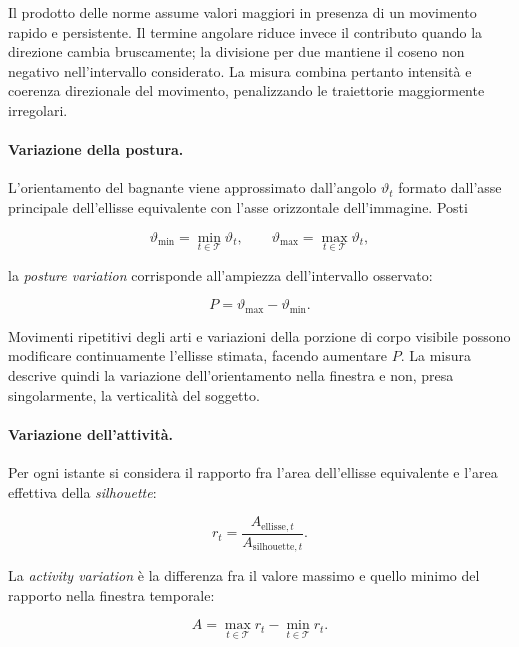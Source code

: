 Il prodotto delle norme assume valori maggiori in presenza di un movimento rapido e persistente. Il termine angolare riduce invece il contributo quando la direzione cambia bruscamente; la divisione per due mantiene il coseno non negativo nell'intervallo considerato. La misura combina pertanto intensità e coerenza direzionale del movimento, penalizzando le traiettorie maggiormente irregolari.

\paragraph{Variazione della postura.}
L'orientamento del bagnante viene approssimato dall'angolo $\vartheta_t$ formato dall'asse principale dell'ellisse equivalente con l'asse orizzontale dell'immagine. Posti

\begin{equation}
    \vartheta_{\min}=\min_{t\in\mathcal{T}}\vartheta_t,
    \qquad
    \vartheta_{\max}=\max_{t\in\mathcal{T}}\vartheta_t,
\end{equation}

la \textit{posture variation} corrisponde all'ampiezza dell'intervallo osservato:

\begin{equation}
    P
    =
    \vartheta_{\max}-\vartheta_{\min}.
\end{equation}

Movimenti ripetitivi degli arti e variazioni della porzione di corpo visibile possono modificare continuamente l'ellisse stimata, facendo aumentare $P$. La misura descrive quindi la variazione dell'orientamento nella finestra e non, presa singolarmente, la verticalità del soggetto.

\paragraph{Variazione dell'attività.}
Per ogni istante si considera il rapporto fra l'area dell'ellisse equivalente e l'area effettiva della \textit{silhouette}:

\begin{equation}
    r_t
    =
    \frac{A_{\mathrm{ellisse},t}}
         {A_{\mathrm{silhouette},t}}.
\end{equation}

La \textit{activity variation} è la differenza fra il valore massimo e quello minimo del rapporto nella finestra temporale:

\begin{equation}
    A
    =
    \max_{t\in\mathcal{T}} r_t
    -
    \min_{t\in\mathcal{T}} r_t.
\end{equation}

